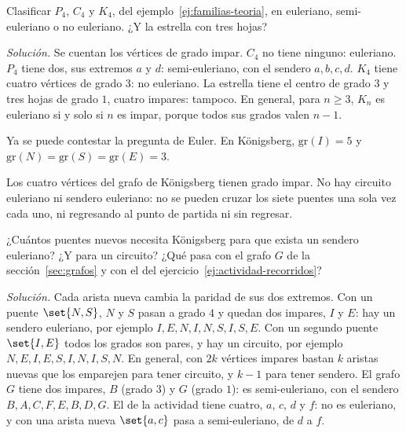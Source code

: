 \documentclass[11pt,letterpaper]{article}
\begin{document}
\begin{ejercicio}
  Clasificar $P_4$, $C_4$ y $K_4$, del ejemplo~\ref{ej:familias-teoria},
  en euleriano, semi-euleriano o no euleriano. ¿Y la estrella con tres
  hojas?

  \textit{Solución.} Se cuentan los vértices de grado impar. $C_4$ no
  tiene ninguno: euleriano. $P_4$ tiene dos, sus extremos $a$ y $d$:
  semi-euleriano, con el sendero $a, b, c, d$. $K_4$ tiene cuatro
  vértices de grado $3$: no euleriano. La estrella tiene el centro de
  grado $3$ y tres hojas de grado $1$, cuatro impares: tampoco. En
  general, para $n \geq 3$, $K_n$ es euleriano si y solo si $n$ es
  impar, porque todos sus grados valen $n - 1$.
\end{ejercicio}

Ya se puede contestar la pregunta de Euler. En Königsberg,
$\text{gr}(I) = 5$ y $\text{gr}(N) = \text{gr}(S) = \text{gr}(E) = 3$.

\begin{resultado}
  Los cuatro vértices del grafo de Königsberg tienen grado impar. No
  hay circuito euleriano ni sendero euleriano: no se pueden cruzar los
  siete puentes una sola vez cada uno, ni regresando al punto de
  partida ni sin regresar.
\end{resultado}

\begin{ejercicio}
  \label{ej:konigsberg-puentes}
  ¿Cuántos puentes nuevos necesita Königsberg para que exista un
  sendero euleriano? ¿Y para un circuito? ¿Qué pasa con el grafo $G$
  de la sección~\ref{sec:grafos} y con el del
  ejercicio~\ref{ej:actividad-recorridos}?

  \textit{Solución.} Cada arista nueva cambia la paridad de sus dos
  extremos. Con un puente $\set{N, S}$, $N$ y $S$ pasan a grado $4$ y
  quedan dos impares, $I$ y $E$: hay un sendero euleriano, por ejemplo
  $I, E, N, I, N, S, I, S, E$. Con un segundo puente $\set{I, E}$ todos
  los grados son pares, y hay un circuito, por ejemplo
  $N, E, I, E, S,\allowbreak I, N, I, S, N$. En general, con $2k$ vértices
  impares bastan $k$ aristas nuevas que los emparejen para tener
  circuito, y $k - 1$ para tener sendero. El grafo $G$ tiene dos
  impares, $B$ (grado $3$) y $G$ (grado $1$): es semi-euleriano, con el
  sendero $B, A, C, F, E, B, D, G$. El de la actividad tiene cuatro,
  $a$, $c$, $d$ y $f$: no es euleriano, y con una arista nueva
  $\set{a, c}$ pasa a semi-euleriano, de $d$ a $f$.
\end{ejercicio}
\end{document}
